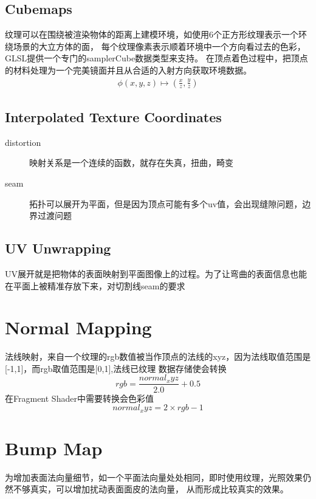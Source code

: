 \subsection{Cubemaps}

纹理可以在围绕被渲染物体的距离上建模环境，如使用6个正方形纹理表示一个环绕场景的大立方体的面，
每个纹理像素表示顺着环境中一个方向看过去的色彩，GLSL提供一个专门的samplerCube数据类型来支持。
在顶点着色过程中，把顶点的材料处理为一个完美镜面并且从合适的入射方向获取环境数据。
\begin{align*}
    \phi(x,y,z) \mapsto (\frac{x}{z},\frac{y}{z})
\end{align*}

\subsection{Interpolated Texture Coordinates }

\begin{description}
    \item [distortion] \textsf{映射关系是一个连续的函数，就存在失真，扭曲，畸变}
    \item [seam] \textsf{拓扑可以展开为平面，但是因为顶点可能有多个uv值，会出现缝隙问题，边界过渡问题}
\end{description}

\subsection{UV Unwrapping}

UV展开就是把物体的表面映射到平面图像上的过程。为了让弯曲的表面信息也能在平面上被精准存放下来，对切割线seam的要求

\section{Normal Mapping}
法线映射，来自一个纹理的rgb数值被当作顶点的法线的xyz，因为法线取值范围是[-1,1]，而rgb取值范围是[0,1],法线已纹理
数据存储使会转换
$$
rgb = \frac{normal_xyz}{2.0} + 0.5
$$
在Fragment Shader中需要转换会色彩值
$$
normal_xyz = 2 \times rgb - 1
$$

\section{Bump Map}

为增加表面法向量细节，如一个平面法向量处处相同，即时使用纹理，光照效果仍然不够真实，可以增加扰动表面面皮的法向量，
从而形成比较真实的效果。

